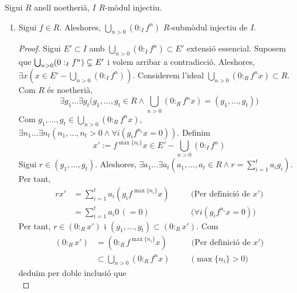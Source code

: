 \begin{lema}\label{lema-tecnic-noetheria-injectiu}
    Sigui $R$ anell noetherià, $I$ $R$-mòdul injectiu.
    \begin{enumerate}
        \item Sigui $f\in R$. Aleshores, $\bigcup_{n>0}(0:_{I}f^{n})$ $R$-submòdul injectiu de $I$.
        \begin{proof}
            Sigui $E'\subset I$ amb $\bigcup_{n>0}(0:_{I}f^{n})\subset E'$ extensió essencial. Suposem que $\bigcup_{n>0}(0:_{I}f^{n})\newline\subsetneq E'$ i volem arribar a contradicció. Aleshores, $\exists x(x\in E'-\bigcup_{n>0}(0:_{I}f^{n}))$. Considerem l'ideal $\bigcup_{n>0}(0:_{R}f^{n}x)\subset R$. Com $R$ és noetherià,
            \begin{equation*}
                \exists g_{1}\ldots\exists g_{t}\Big(g_{1},\ldots,g_{t}\in R\land\bigcup_{n>0}(0:_{R}f^{n}x)=(g_{1},\ldots,g_{t})\Big)
            \end{equation*}
            Com $g_{1},\ldots,g_{t}\in\bigcup_{n>0}(0:_{R}f^{n}x)$, $\exists n_{1}\ldots\exists n_{t}(n_{1},\ldots,n_{t}>0\land\forall i(g_{i}f^{n_{i}}x=0))$. Definim
            \begin{equation*}
                x':=f^{\max\{n_{i}\}}x\in E'-\bigcup_{n>0}(0:_{I}f^{n})
            \end{equation*}
            Sigui $r\in(g_{1},\ldots,g_{t})$. Aleshores, $\exists a_{1}\ldots\exists a_{t}(a_{1},\ldots,a_{t}\in R\land r=\sum_{i=1}^{t}a_{i}g_{i})$. Per tant,
            \begin{align*}
                rx'
                &=\sum_{i=1}^{t}a_{i}(g_{i}f^{\max\{n_{i}\}}x)
                &\quad&\textrm{(Per definició de $x'$)}\\
                &=\sum_{i=1}^{t}a_{i}0
                \,(=0)
                &\quad&\textrm{($\forall i(g_{i}f^{n_{i}}x=0)$)}
            \end{align*}
            Per tant, $r\in(0:_{R}x')$ i $(g_{1},\ldots,g_{t})\subset(0:_{R}x')$. Com
            \begin{align*}
                (0:_{R}x')
                &=(0:_{R}f^{\max\{n_{i}\}}x)
                &\quad&\textrm{(Per definició de $x'$)}\\
                &\subset\bigcup_{n>0}(0:_{R}f^{n}x)
                &\quad&\textrm{($\max\{n_{i}\}>0$)}
            \end{align*}
            deduïm per doble inclusió que
            \begin{equation*}

\end{equation*}
\end{proof}
\end{enumerate}
\end{lema}
